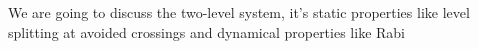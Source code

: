 We are going to discuss the two-level system, it's static properties like level splitting at avoided crossings and dynamical properties like Rabi 